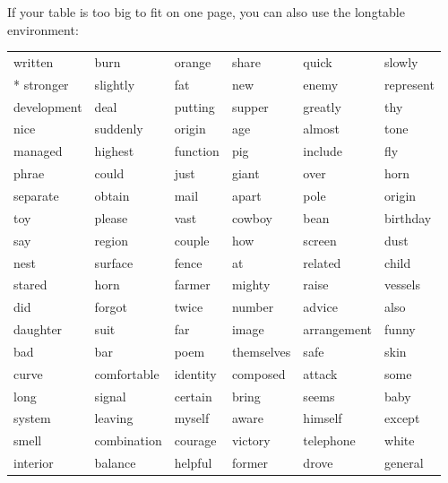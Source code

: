 \documentclass{jcls}
\begin{document}
If your table is too big to fit on one page, you can also use the longtable environment:

\begin{fullwidth}
  \begin{longtable}{@{}llllll@{}}
    \toprule
    written     & burn        & orange   & share      & quick       & slowly    \\* \midrule
    \endhead
    \endfoot
    \endlastfoot
    stronger    & slightly    & fat      & new        & enemy       & represent \\
    development & deal        & putting  & supper     & greatly     & thy       \\
    nice        & suddenly    & origin   & age        & almost      & tone      \\
    managed     & highest     & function & pig        & include     & fly       \\
    phrae       & could       & just     & giant      & over        & horn      \\
    separate    & obtain      & mail     & apart      & pole        & origin    \\
    toy         & please      & vast     & cowboy     & bean        & birthday  \\
    say         & region      & couple   & how        & screen      & dust      \\
    nest        & surface     & fence    & at         & related     & child     \\
    stared      & horn        & farmer   & mighty     & raise       & vessels   \\
    did         & forgot      & twice    & number     & advice      & also      \\
    daughter    & suit        & far      & image      & arrangement & funny     \\
    bad         & bar         & poem     & themselves & safe        & skin      \\
    curve       & comfortable & identity & composed   & attack      & some      \\
    long        & signal      & certain  & bring      & seems       & baby      \\
    system      & leaving     & myself   & aware      & himself     & except    \\
    smell       & combination & courage  & victory    & telephone   & white     \\
    interior    & balance     & helpful  & former     & drove       & general   \\

\end{longtable}
\end{fullwidth}
\end{document}
